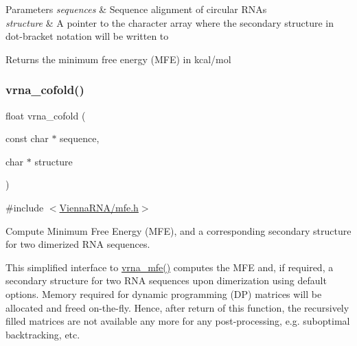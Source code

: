 \begin{DoxyParams}{Parameters}
{\em sequences} & Sequence alignment of circular R\+N\+As \\
\hline
{\em structure} & A pointer to the character array where the secondary structure in dot-\/bracket notation will be written to \\
\hline
\end{DoxyParams}
\begin{DoxyReturn}{Returns}
the minimum free energy (M\+FE) in kcal/mol 
\end{DoxyReturn}
\mbox{\label{group__mfe__global_ga9ef3a297201dbf838a8daff2b45c0c82}} 
\subsubsection{\texorpdfstring{vrna\+\_\+cofold()}{vrna\_cofold()}}
{\footnotesize\ttfamily float vrna\+\_\+cofold (\begin{DoxyParamCaption}\item[{const char $\ast$}]{sequence,  }\item[{char $\ast$}]{structure }\end{DoxyParamCaption})}



{\ttfamily \#include $<$\hyperlink{mfe_8h}{Vienna\+R\+N\+A/mfe.\+h}$>$}



Compute Minimum Free Energy (M\+FE), and a corresponding secondary structure for two dimerized R\+NA sequences. 

This simplified interface to \hyperlink{group__mfe__global_gabd3b147371ccf25c577f88bbbaf159fd}{vrna\+\_\+mfe()} computes the M\+FE and, if required, a secondary structure for two R\+NA sequences upon dimerization using default options. Memory required for dynamic programming (DP) matrices will be allocated and free\textquotesingle{}d on-\/the-\/fly. Hence, after return of this function, the recursively filled matrices are not available any more for any post-\/processing, e.\+g. suboptimal backtracking, etc.

